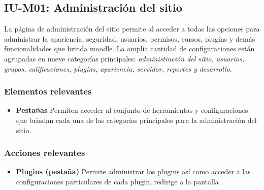 
\subsection{IU-M01: Administración del sitio}

 La página de administración del sitio permite al  acceder a todas las
 opciones para administrar la apariencia, seguridad, usuarios, permisos, cursos, plugins y demás
 funcionalidades que brinda moodle. La amplia cantidad de configuraciones están agrupadas en nueve
 categorías principales: {\it administración del sitio, usuarios, grupos, calificaciones, plugins,
 apariencia, servidor, reportes y desarrollo}.


\subsubsection{Elementos relevantes}

    \begin{itemize}
    \item {\bf Pestañas}
        Permiten acceder al conjunto de herramientas y configuraciones que brindan
        cada una de las categorías principales para la administración del sitio.
    \end{itemize}

\subsubsection{Acciones relevantes}

    \begin{itemize}
    \item {\bf Plugins (pestaña)}
        Permite administrar los plugins así como acceder a las configuraciones particulares de
        cada plugin, redirige a la pantalla .
    \end{itemize}

\clearpage
